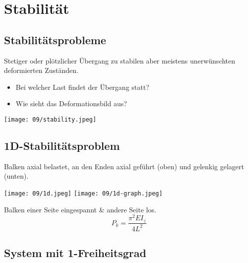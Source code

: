 \section{Stabilität}
    \subsection{Stabilitätsprobleme}
        Stetiger oder plötzlicher Übergang zu stabilen aber meistens unerwünschten deformierten Zuständen.\vspace{-1mm}
        \begin{itemize}
            \item Bei welcher Last findet der Übergang statt?
            \item Wie sieht das Deformationsbild aus?
        \end{itemize}
        \begin{center}
            \texttt{[image: 09/stability.jpeg]}
        \end{center}
    \subsection{1D-Stabilitätsproblem}
        Balken axial belastet, an den Enden axial geführt (oben) und gelenkig gelagert (unten).
        \begin{center}
            \texttt{[image: 09/1d.jpeg]}
            \texttt{[image: 09/1d-graph.jpeg]}
        \end{center}
        Balken einer Seite eingespannt \& andere Seite los.
        \[P_k=\frac{\pi^2EI_z}{4L^2}\]
    \subsection{System mit 1-Freiheitsgrad}
        \TODO{}